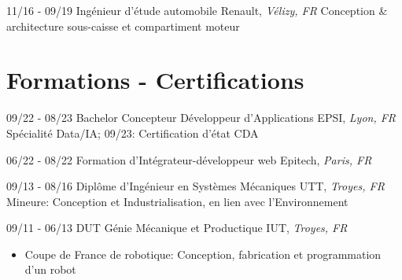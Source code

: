 \documentclass[]{friggeri-cv}
\begin{document}
\begin{entrylist}
  \entry
    {11/16 - 09/19}
    {Ingénieur d'étude automobile}
    {Renault, \textit{Vélizy, FR}}
    {Conception \& architecture sous-caisse et compartiment moteur}
\end{entrylist}

\vspace*{-0.5cm}
\vspace*{0.45cm}
\section{Formations - Certifications}
\vspace*{-0.25cm}
\vspace{0.5mm}
    \begin{entrylist}
    \entry
        {09/22 - 08/23}
        {Bachelor Concepteur Développeur d'Applications}
        {EPSI, \textit{Lyon, FR}}
        {Spécialité Data/IA; \hspace{7mm} 09/23: Certification d'état CDA}
    \end{entrylist}
    \vspace{0.5mm}
\begin{entrylist}
\entry
    {06/22 - 08/22}
    {Formation d'Intégrateur-développeur web}
    {Epitech, \textit{Paris, FR}}
    {}
\end{entrylist}
\vspace{0.5mm}
    \begin{entrylist}
    \entry
        {09/13 - 08/16}
        {Diplôme d'Ingénieur en Systèmes Mécaniques}
        {UTT, \textit{Troyes, FR}}
        {Mineure: Conception et Industrialisation, en lien avec l’Environnement}
    \end{entrylist}
    \vspace{0.5mm}
\begin{entrylist}
\entry
    {09/11 - 06/13}
    {DUT Génie Mécanique et Productique}
    {IUT, \textit{Troyes, FR}}
    {}
\end{entrylist}
\vspace*{-0.7cm}
\begin{itemize}
\setlength{\itemsep}{1pt}
\setlength{\parskip}{0pt}
\setlength{\parsep}{0pt}
\item Coupe de France de robotique: Conception, fabrication et programmation d’un robot
\end{itemize}
\end{document}
